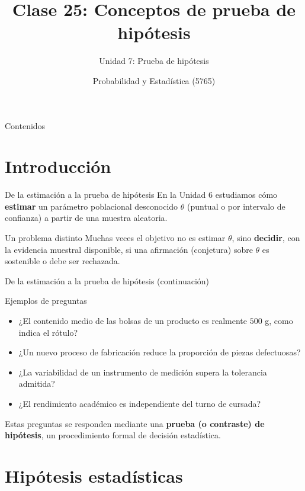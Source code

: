 \documentclass[aspectratio=169,11pt]{beamer}
\title[Prob. y Estadística]{Clase 25: Conceptos de prueba de hipótesis}
\subtitle{Unidad 7: Prueba de hipótesis}
\institute[UNS]{Universidad Nacional del Sur \\ Departamento de Matemática}
\author{Probabilidad y Estadística (5765)}
\date{}
\begin{document}
\begin{frame}
\titlepage
\end{frame}

\begin{frame}{Contenidos}
\tableofcontents
\end{frame}

\section{Introducción}

\begin{frame}{De la estimación a la prueba de hipótesis}
En la Unidad 6 estudiamos cómo \textbf{estimar} un parámetro poblacional desconocido $\theta$ (puntual o por intervalo de confianza) a partir de una muestra aleatoria.

\begin{block}{Un problema distinto}
Muchas veces el objetivo no es estimar $\theta$, sino \textbf{decidir}, con la evidencia muestral disponible, si una afirmación (conjetura) sobre $\theta$ es sostenible o debe ser rechazada.
\end{block}

\end{frame}

\begin{frame}{De la estimación a la prueba de hipótesis (continuación)}
\begin{exampleblock}{Ejemplos de preguntas}
\begin{itemize}
\item ¿El contenido medio de las bolsas de un producto es realmente $500$ g, como indica el rótulo?
\item ¿Un nuevo proceso de fabricación reduce la proporción de piezas defectuosas?
\item ¿La variabilidad de un instrumento de medición supera la tolerancia admitida?
\item ¿El rendimiento académico es independiente del turno de cursada?
\end{itemize}
\end{exampleblock}

Estas preguntas se responden mediante una \textbf{prueba (o contraste) de hipótesis}, un procedimiento formal de decisión estadística.
\end{frame}

\section{Hipótesis estadísticas}
\end{document}
